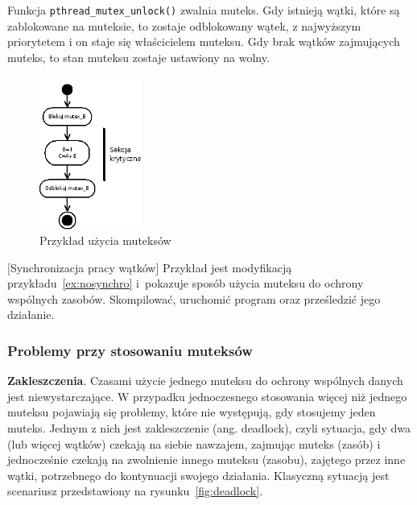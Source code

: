 Funkcja \lstinline[style=MyCStyle]{pthread_mutex_unlock()} zwalnia muteks. Gdy istnieją wątki, które są zablokowane na muteksie, to zostaje odblokowany wątek, z najwyższym priorytetem i on staje się właścicielem muteksu. Gdy brak wątków zajmujących muteks, to stan muteksu zostaje ustawiony na wolny.

\begin{figure}[!h]
\centering
\includegraphics[width=0.3\textwidth]{img/thrd_mutex}
\caption{Przykład użycia muteksów}
\label{fig:mutex}
\end{figure}

\begin{example}{[Synchronizacja pracy wątków]}
Przykład jest modyfikacją przykładu~\ref{ex:nosynchro} i~pokazuje sposób użycia muteksu do ochrony wspólnych zasobów. Skompilować, uruchomić program oraz prześledzić jego działanie.


\end{example}

\subsubsection{Problemy przy stosowaniu muteksów}

\textbf{Zakleszczenia}. Czasami użycie jednego muteksu do ochrony wspólnych danych jest niewystarczające. W przypadku jednoczesnego stosowania więcej niż jednego muteksu pojawiają się problemy, które nie występują, gdy stosujemy jeden muteks. Jednym z nich jest zakleszczenie (ang. deadlock), czyli sytuacja, gdy dwa (lub więcej wątków) czekają na siebie nawzajem, zajmując muteks (zasób) i jednocześnie czekają na zwolnienie innego muteksu (zasobu), zajętego przez inne wątki, potrzebnego do kontynuacji swojego działania. Klasyczną sytuacją jest scenariusz przedstawiony na rysunku~\ref{fig:deadlock}.

